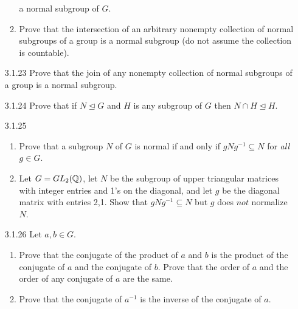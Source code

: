 \begin{enumerate}
\begin{enumerate}
                           a normal subgroup of $G$.
                     \item Prove that the intersection of an arbitrary nonempty
                           collection of normal subgroups of a group is a normal
                           subgroup (do not assume the collection is countable).
                  \end{enumerate}
   \item[3.1.23]  Prove that the join of any nonempty collection of normal
                  subgroups of a group is a normal subgroup.
   \item[3.1.24]  Prove that if $N \trianglelefteq G$ and $H$ is any subgroup of
                  $G$ then $N \cap H \trianglelefteq H$.
   \item[3.1.25]  \begin{enumerate}
                     \item Prove that a subgroup $N$ of $G$ is normal if and
                           only if $gNg^{-1} \subseteq N$ for \textit{all}
                           $g \in G$.
                     \item Let $G = GL_2(\mathbb{Q})$, let $N$ be the subgroup of upper
                           triangular matrices with integer entries and 1's on
                           the diagonal, and let $g$ be the diagonal matrix with
                           entries 2,1. Show that $gNg^{-1} \subseteq N$ but $g$
                           does $\textit{not}$ normalize $N$.
                  \end{enumerate}
   \item[3.1.26]  Let $a, b \in G$.
                  \begin{enumerate}
                     \item Prove that the conjugate of the product of $a$ and
                           $b$ is the product of the conjugate of $a$ and the
                           conjugate of $b$. Prove that the order of $a$ and the
                           order of any conjugate of $a$ are the same.
                     \item Prove that the conjugate of $a^{-1}$ is the inverse
                           of the conjugate of $a$.

\end{enumerate}
\end{enumerate}
